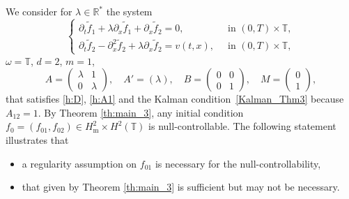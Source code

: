 \documentclass[10pt]{amsart}
\theoremstyle{plain}
\theoremstyle{definition}
\theoremstyle{remark}
\newcommand{\set}{\mathbb}
\newcommand{\T}{\set{T}}
\newcommand{\m}{{\mathrm m}}
\begin{document}
We consider for $\lambda\in\mathbb{R}^*$ the system\vspace*{-3pt}
\begin{equation} \label{c-ex_parab}
\begin{cases}
\partial_t \widetilde{f}_1 + \lambda \partial_x \widetilde{f}_1 + \partial_x \widetilde{f}_2 = 0, &\ \text{ in } (0,T)\times\T, \\
\partial_t \widetilde{f}_2 - \partial_x^2 \widetilde{f}_2 + \lambda \partial_x \widetilde{f}_2 = v(t,x), &\ \text{ in } (0,T)\times\T,
\end{cases}
\end{equation}
\ie $\omega=\T$, $d=2$, $m=1$,\vspace*{-3pt}\enlargethispage{.5\baselineskip}%
\[
A=\begin{pmatrix}
\lambda & 1 \\ 0 & \lambda
\end{pmatrix},\quad
A'=(\lambda), \quad
B=\begin{pmatrix}
0 & 0 \\ 0 & 1
\end{pmatrix},\quad
M=\begin{pmatrix}
0 \\ 1
\end{pmatrix},
\]
that satisfies \eqref{h:D}, \eqref{h:A1} and the Kalman condition~\eqref{Kalman_Thm3} because $A_{12}=1$.
By Theorem \ref{th:main_3}, any initial condition $f_0=(f_{01},f_{02})\in H^{2}_\m \times H^2(\T)$ is null-controllable.
The following statement illustrates that
\begin{itemize}
\item a regularity assumption on $f_{01}$ is necessary for the null-controllability,
\item that given by Theorem \ref{th:main_3} is sufficient but may not be necessary.
\end{itemize}
\end{document}
